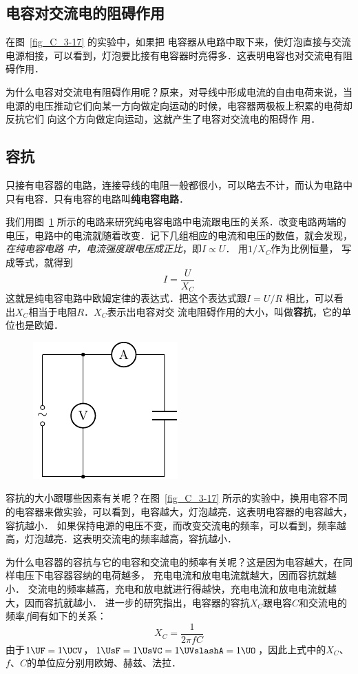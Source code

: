 \subsection{电容对交流电的阻碍作用}
在图~\ref{fig_C_3-17} 的实验中，如果把
电容器从电路中取下来，使灯泡直接与交流电源相接，可以看到，灯泡要比接有电容器时亮得多．这表明电容也对交流电有阻碍作用．

为什么电容对交流电有阻碍作用呢？原来，对导线中形成电流的自由电荷来说，当电源的电压推动它们向某一方向做定向运动的时候，电容器两极板上积累的电荷却反抗它们
向这个方向做定向运动，这就产生了电容对交流电的阻碍作
用．

\subsection{容抗}

只接有电容器的电路，连接导线的电阻一般都很小，可以略去不计，而认为电路中只有电容．只有电容的电路叫\textbf{纯电容电路}．


我们用图~\ref{fig_C_3-18} 所示的电路来研究纯电容电路中电流跟电压的关系．改变电路两端的电压，电路中的电流就随着改变．记下几组相应的电流和电压的数值，就会发现，\textit{在纯电容电路
中，电流强度跟电压成正比}，即$I\propto U$．
用$1/X_C$作为比例恒量，
写成等式，就得到
\[I=\frac{U}{X_C}\]
这就是纯电容电路中欧姆定律的表达式．把这个表达式跟$I=U/R$
相比，可以看出$X_C$相当于电阻$R$．$X_C$表示出电容对交
流电阻碍作用的大小，叫做\textbf{容抗}，它的单位也是欧姆．

\begin{figure}[htbp]
	\centering
	\includegraphics{fig/C/3-18.pdf}
	\caption{}\label{fig_C_3-18}
\end{figure}


容抗的大小跟哪些因素有关呢？在图~\ref{fig_C_3-17} 所示的实验中，换用电容不同的电容器来做实验，可以看到，电容越大，灯泡越亮．这表明电容器的电容越大，容抗越小．
如果保持电源的电压不变，而改变交流电的频率，可以看到，频率越高，灯泡越亮．这表明交流电的频率越高，容抗越小．

为什么电容器的容抗与它的电容和交流电的频率有关呢？这是因为电容越大，在同样电压下电容器容纳的电荷越多，
充电电流和放电电流就越大，因而容抗就越小．
交流电的频率越高，充电和放电就进行得越快，充电电流和放电电流就越大，因而容抗就越小．
进一步的研究指出，电容器的容抗$X_C$跟电容$C$和交流电的频率$f$间有如下的关系：
\[X_C=\frac{1}{2\pi fC} \]
由于$1\UF=1\UCV$，$1 \UsF =1 \UsVC =1 \UVslashA =1\UO $，因此上式中的$X_C$、$f$、$C$的单位应分别用欧姆、赫兹、法拉．

